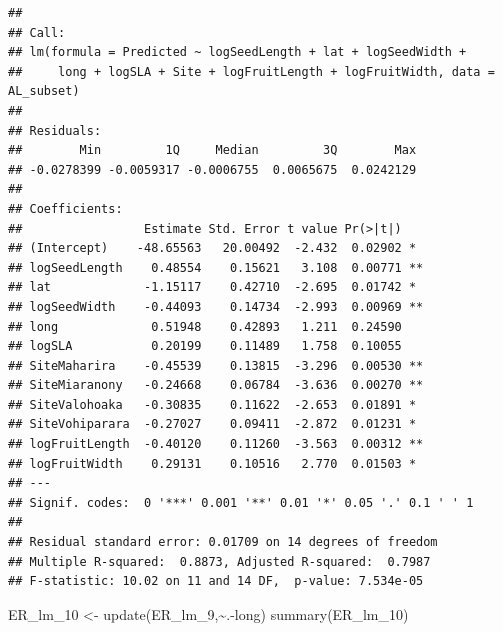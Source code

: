\documentclass[
  12pt,
]{article}
\newenvironment{Shaded}{\begin{snugshade}}{\end{snugshade}}
\newcommand{\FunctionTok}[1]{\textcolor[rgb]{0.00,0.00,0.00}{#1}}
\newcommand{\NormalTok}[1]{#1}
\newcommand{\OtherTok}[1]{\textcolor[rgb]{0.56,0.35,0.01}{#1}}
\newcommand{\SpecialCharTok}[1]{\textcolor[rgb]{0.00,0.00,0.00}{#1}}
\begin{document}
\begin{verbatim}
## 
## Call:
## lm(formula = Predicted ~ logSeedLength + lat + logSeedWidth + 
##     long + logSLA + Site + logFruitLength + logFruitWidth, data = AL_subset)
## 
## Residuals:
##        Min         1Q     Median         3Q        Max 
## -0.0278399 -0.0059317 -0.0006755  0.0065675  0.0242129 
## 
## Coefficients:
##                 Estimate Std. Error t value Pr(>|t|)   
## (Intercept)    -48.65563   20.00492  -2.432  0.02902 * 
## logSeedLength    0.48554    0.15621   3.108  0.00771 **
## lat             -1.15117    0.42710  -2.695  0.01742 * 
## logSeedWidth    -0.44093    0.14734  -2.993  0.00969 **
## long             0.51948    0.42893   1.211  0.24590   
## logSLA           0.20199    0.11489   1.758  0.10055   
## SiteMaharira    -0.45539    0.13815  -3.296  0.00530 **
## SiteMiaranony   -0.24668    0.06784  -3.636  0.00270 **
## SiteValohoaka   -0.30835    0.11622  -2.653  0.01891 * 
## SiteVohiparara  -0.27027    0.09411  -2.872  0.01231 * 
## logFruitLength  -0.40120    0.11260  -3.563  0.00312 **
## logFruitWidth    0.29131    0.10516   2.770  0.01503 * 
## ---
## Signif. codes:  0 '***' 0.001 '**' 0.01 '*' 0.05 '.' 0.1 ' ' 1
## 
## Residual standard error: 0.01709 on 14 degrees of freedom
## Multiple R-squared:  0.8873, Adjusted R-squared:  0.7987 
## F-statistic: 10.02 on 11 and 14 DF,  p-value: 7.534e-05
\end{verbatim}

\begin{Shaded}
\begin{Highlighting}[]
\NormalTok{ER\_lm\_10 }\OtherTok{\textless{}{-}} \FunctionTok{update}\NormalTok{(ER\_lm\_9,}\SpecialCharTok{\textasciitilde{}}\NormalTok{.}\SpecialCharTok{{-}}\NormalTok{long)}
\FunctionTok{summary}\NormalTok{(ER\_lm\_10)}
\end{Highlighting}
\end{Shaded}
\end{document}
